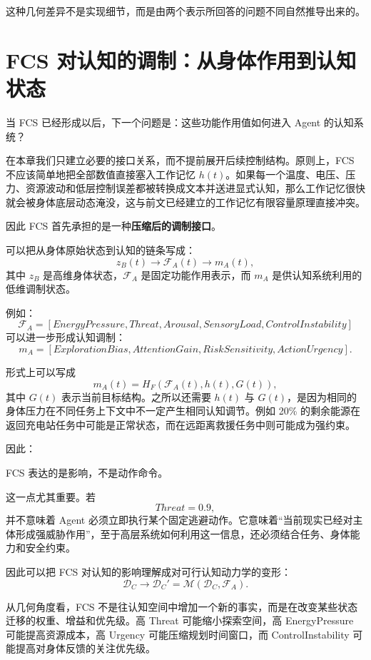 这种几何差异不是实现细节，而是由两个表示所回答的问题不同自然推导出来的。


\section{FCS 对认知的调制：从身体作用到认知状态}

当 FCS 已经形成以后，下一个问题是：这些功能作用值如何进入 Agent 的认知系统？

在本章我们只建立必要的接口关系，而不提前展开后续控制结构。原则上，FCS 不应该简单地把全部数值直接塞入工作记忆 $h(t)$。如果每一个温度、电压、压力、资源波动和低层控制误差都被转换成文本并送进显式认知，那么工作记忆很快就会被身体底层动态淹没，这与前文已经建立的工作记忆有限容量原理直接冲突。

因此 FCS 首先承担的是一种\textbf{压缩后的调制接口}。

可以把从身体原始状态到认知的链条写成：
\[
z_B(t)
\longrightarrow
\mathcal F_A(t)
\longrightarrow
m_A(t),
\]
其中 $z_B$ 是高维身体状态，$\mathcal F_A$ 是固定功能作用表示，而 $m_A$ 是供认知系统利用的低维调制状态。

例如：
\[
\mathcal F_A=
[
EnergyPressure,
Threat,
Arousal,
SensoryLoad,
ControlInstability
]
\]
可以进一步形成认知调制：
\[
m_A=
[
ExplorationBias,
AttentionGain,
RiskSensitivity,
ActionUrgency
].
\]

形式上可以写成
\[
m_A(t)
=
H_F
\left(
\mathcal F_A(t),
h(t),
G(t)
\right),
\]
其中 $G(t)$ 表示当前目标结构。之所以还需要 $h(t)$ 与 $G(t)$，是因为相同的身体压力在不同任务上下文中不一定产生相同认知调节。例如 20\% 的剩余能源在返回充电站任务中可能是正常状态，而在远距离救援任务中则可能成为强约束。

因此：
\begin{statementbox}
\centering
{}
\end{statementbox}
FCS 表达的是影响，不是动作命令。

这一点尤其重要。若
\[
Threat=0.9,
\]
并不意味着 Agent 必须立即执行某个固定逃避动作。它意味着“当前现实已经对主体形成强威胁作用”，至于高层系统如何利用这一信息，还必须结合任务、身体能力和安全约束。

因此可以把 FCS 对认知的影响理解成对可行认知动力学的变形：
\[
\mathcal D_C
\longrightarrow
\mathcal D_C'
=
\mathcal M
\left(
\mathcal D_C,
\mathcal F_A
\right).
\]

从几何角度看，FCS 不是往认知空间中增加一个新的事实，而是在改变某些状态迁移的权重、增益和优先级。高 Threat 可能缩小探索空间，高 EnergyPressure 可能提高资源成本，高 Urgency 可能压缩规划时间窗口，而 ControlInstability 可能提高对身体反馈的关注优先级。

